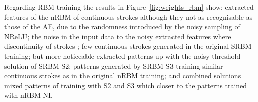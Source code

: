 Regarding RBM training\DIFaddbegin \DIFadd{,
}\DIFaddend %
the results in Figure~\ref{fig:weights_rbm} show:
extracted features of the nRBM \DIFdelbegin {}\DIFdelend \DIFaddbegin {}\DIFaddend of continuous strokes although they \DIFdelbegin {}\DIFdelend \DIFaddbegin {}\DIFaddend not as recognisable as those of the AE, due to the randomness introduced by the noisy sampling of NReLU;
the noise in the input data \DIFdelbegin {}\DIFdelend \DIFaddbegin {}\DIFaddend to the noisy extracted features where discontinuity of strokes \DIFdelbegin {}\DIFdelend \DIFaddbegin {}\DIFaddend ;
few continuous strokes \DIFdelbegin {}\DIFdelend \DIFaddbegin {}\DIFaddend generated in the original SRBM training;
but more noticeable extracted patterns \DIFdelbegin {}\DIFdelend \DIFaddbegin {}\DIFaddend up with the noisy threshold solution of SRBM-S2;
patterns generated by SRBM-S3 training \DIFdelbegin {}\DIFdelend \DIFaddbegin {}\DIFaddend similar continuous strokes as in the original nRBM training;
and combined solutions \DIFdelbegin {}\DIFdelend \DIFaddbegin {}\DIFaddend mixed patterns of training with S2 and S3 which \DIFdelbegin {}\DIFdelend \DIFaddbegin {}\DIFaddend closer to the patterns trained with nRBM-NI. 

